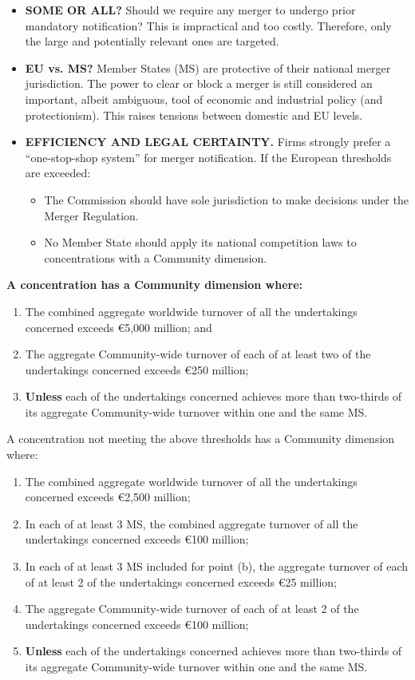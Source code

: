     \begin{itemize}
        \item \textbf{SOME OR ALL?} Should we require any merger to undergo prior mandatory notification? This is impractical and too costly. Therefore, only the large and potentially relevant ones are targeted.
        \item \textbf{EU vs. MS?} Member States (MS) are protective of their national merger jurisdiction. The power to clear or block a merger is still considered an important, albeit ambiguous, tool of economic and industrial policy (and protectionism). This raises tensions between domestic and EU levels.
        \item \textbf{EFFICIENCY AND LEGAL CERTAINTY.} Firms strongly prefer a “one-stop-shop system” for merger notification. If the European thresholds are exceeded:
        \begin{itemize}
            \item The Commission should have sole jurisdiction to make decisions under the Merger Regulation.
            \item No Member State should apply its national competition laws to concentrations with a Community dimension.
        \end{itemize}
    \end{itemize}

\newpage
    \noindent
    \textbf{A concentration has a Community dimension where:}
    \begin{enumerate}[label=\alph*)]
        \item The combined aggregate worldwide turnover of all the undertakings concerned exceeds €5,000 million; and
        \item The aggregate Community-wide turnover of each of at least two of the undertakings concerned exceeds €250 million; 
        \item \textbf{Unless} each of the undertakings concerned achieves more than two-thirds of its aggregate Community-wide turnover within one and the same MS.
    \end{enumerate}
    
    \noindent
    A concentration not meeting the above thresholds has a Community dimension where:
    \begin{enumerate}[label=\alph*)]
        \item The combined aggregate worldwide turnover of all the undertakings concerned exceeds €2,500 million;
        \item In each of at least 3 MS, the combined aggregate turnover of all the undertakings concerned exceeds €100 million;
        \item In each of at least 3 MS included for point (b), the aggregate turnover of each of at least 2 of the undertakings concerned exceeds €25 million;
        \item The aggregate Community-wide turnover of each of at least 2 of the undertakings concerned exceeds €100 million;
        \item \textbf{Unless} each of the undertakings concerned achieves more than two-thirds of its aggregate Community-wide turnover within one and the same MS.
    \end{enumerate}

